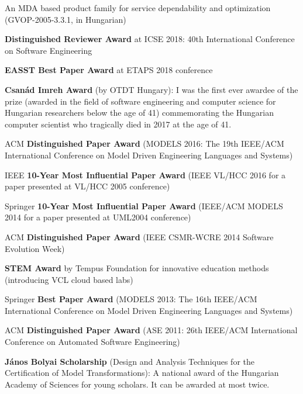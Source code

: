 \documentclass{xetexCV}
\begin{document}
An MDA based product family for service dependability and
optimization (GVOP-2005-3.3.1, in Hungarian)  



\textbf{Distinguished Reviewer Award}  at ICSE 2018: 40th International Conference on Software Engineering

\textbf{EASST Best Paper Award}  at ETAPS 2018 conference  

\textbf{Csanád Imreh Award}  (by OTDT Hungary): I was the first ever awardee of the prize (awarded in the field of software engineering and computer science for Hungarian researchers below the age of 41) commemorating the Hungarian computer scientist who tragically died in 2017 at the age of 41.  

ACM  \textbf{Distinguished Paper Award} (MODELS 2016: The 19th IEEE/ACM International Conference on Model Driven Engineering Languages and Systems) 

IEEE  \textbf{10-Year Most Influential Paper Award} \newline (IEEE VL/HCC 2016 for a paper presented at VL/HCC 2005 conference) 

Springer  \textbf{10-Year Most Influential Paper Award} \newline (IEEE/ACM MODELS 2014 for a paper presented at UML2004 conference) 

ACM \textbf{Distinguished Paper Award} \newline (IEEE CSMR-WCRE 2014 Software Evolution Week) 

\textbf{STEM Award}  by Tempus Foundation \newline for innovative education methods (introducing VCL cloud based labs)

Springer  \textbf{Best Paper Award} (MODELS 2013: The 16th IEEE/ACM International Conference on Model Driven 
Engineering Languages and Systems) 

ACM \textbf{Distinguished Paper Award} (ASE 2011: 26th IEEE/ACM International Conference on Automated Software Engineering) 

\textbf{J\'anos Bolyai Scholarship} (Design and Analysis Techniques
for the Certification of Model Transformations): A national
award of the Hungarian Academy of Sciences for young scholars. It can be awarded
at most twice.
\end{document}
